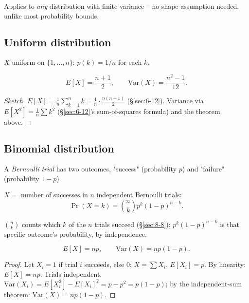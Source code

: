 \documentclass[11pt]{article}
\begin{document}
\begin{note}
Applies to \emph{any} distribution with finite variance -- no shape assumption needed, unlike most probability bounds.
\end{note}

\subsection{Uniform distribution}
\label{sec:10-7}

\begin{definition}
$X$ uniform on $\{1,\dots,n\}$: $p(k)=1/n$ for each $k$.
\end{definition}

\begin{theorem}
\[
E[X] = \frac{n+1}{2}, \qquad \mathrm{Var}(X) = \frac{n^2-1}{12}.
\]
\end{theorem}
\begin{proof}[Sketch]
$E[X]=\frac1n\sum_{k=1}^n k = \frac1n\cdot\frac{n(n+1)}{2}$ (\S\ref{sec:6-12}). Variance via $E[X^2]=\frac1n\sum k^2$ (\S\ref{sec:6-12}'s sum-of-squares formula) and the theorem above.
\end{proof}

\subsection{Binomial distribution}
\label{sec:10-8}

\begin{definition}
A \emph{Bernoulli trial} has two outcomes, "success" (probability $p$) and "failure" (probability $1-p$).
\end{definition}

\begin{definition}
$X=$ number of successes in $n$ independent Bernoulli trials:
\[
\Pr(X=k) = \binom{n}{k}p^k(1-p)^{n-k}.
\]
\end{definition}
\begin{note}
$\binom nk$ counts which $k$ of the $n$ trials succeed (\S\ref{sec:8-8}); $p^k(1-p)^{n-k}$ is that specific outcome's probability, by independence.
\end{note}

\begin{theorem}
\[
E[X] = np, \qquad \mathrm{Var}(X) = np(1-p).
\]
\end{theorem}
\begin{proof}
Let $X_i=1$ if trial $i$ succeeds, else $0$; $X=\sum X_i$, $E[X_i]=p$. By linearity: $E[X]=np$. Trials independent, $\mathrm{Var}(X_i)=E[X_i^2]-E[X_i]^2 = p-p^2=p(1-p)$; by the independent-sum theorem: $\mathrm{Var}(X)=np(1-p)$.
\end{proof}
\end{document}
